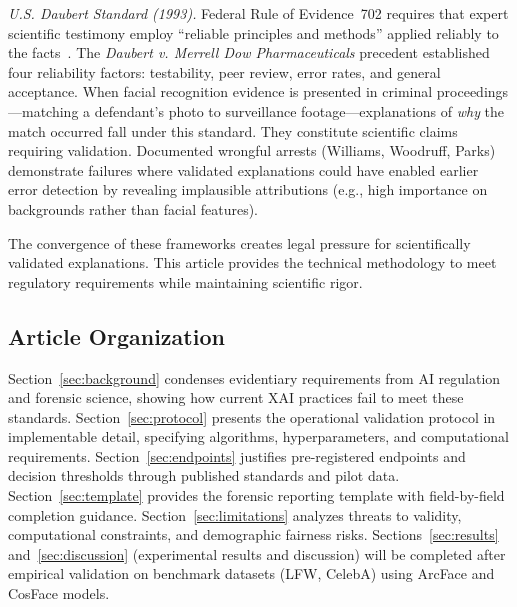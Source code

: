 \textit{U.S. Daubert Standard (1993).} Federal Rule of Evidence~702 requires that expert scientific testimony employ ``reliable principles and methods'' applied reliably to the facts~\cite{daubert1993}. The \textit{Daubert v. Merrell Dow Pharmaceuticals} precedent established four reliability factors: testability, peer review, error rates, and general acceptance. When facial recognition evidence is presented in criminal proceedings—matching a defendant's photo to surveillance footage—explanations of \textit{why} the match occurred fall under this standard. They constitute scientific claims requiring validation. Documented wrongful arrests (Williams, Woodruff, Parks) demonstrate failures where validated explanations could have enabled earlier error detection by revealing implausible attributions (e.g., high importance on backgrounds rather than facial features).

The convergence of these frameworks creates legal pressure for scientifically validated explanations. This article provides the technical methodology to meet regulatory requirements while maintaining scientific rigor.

\subsection{Article Organization}

Section~\ref{sec:background} condenses evidentiary requirements from AI regulation and forensic science, showing how current XAI practices fail to meet these standards. Section~\ref{sec:protocol} presents the operational validation protocol in implementable detail, specifying algorithms, hyperparameters, and computational requirements. Section~\ref{sec:endpoints} justifies pre-registered endpoints and decision thresholds through published standards and pilot data. Section~\ref{sec:template} provides the forensic reporting template with field-by-field completion guidance. Section~\ref{sec:limitations} analyzes threats to validity, computational constraints, and demographic fairness risks. Sections~\ref{sec:results} and~\ref{sec:discussion} (experimental results and discussion) will be completed after empirical validation on benchmark datasets (LFW, CelebA) using ArcFace and CosFace models.
